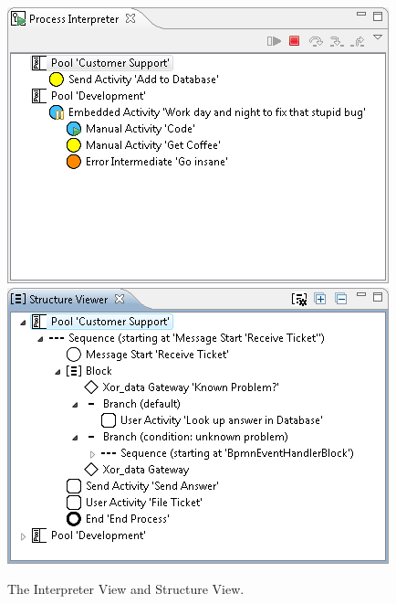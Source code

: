 \begin{figure}[t]
	\centering
	\includegraphics[width=.4\textwidth]{figures/features/interpreterView.png}
	\hspace{.5cm}
	\includegraphics[width=.4\textwidth]{figures/features/structureView.png}
	\caption{The Interpreter View and Structure View.}
	\label{fig:customViews2}
\end{figure}
